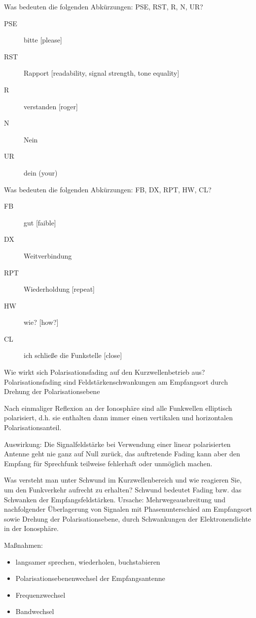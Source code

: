\documentclass[avery5371,grid,frame,a4paper]{flashcards}
\newcommand{\card}[3]{
  \begin{flashcard}[{\chap} -- #1]{#2}#3\end{flashcard}
}
\begin{document}
\card{42}{Was bedeuten die folgenden Abkürzungen: PSE, RST, R, N, UR?}{
  \begin{description}
    \item[PSE] bitte [please]
    \item[RST] Rapport [readability, signal strength, tone equality]
    \item[R] verstanden [roger]
    \item[N] Nein
    \item[UR] dein (your)
  \end{description}
}
\card{42}{Was bedeuten die folgenden Abkürzungen: FB, DX, RPT, HW, CL?}{
  \begin{description}
    \item[FB] gut [faible]
    \item[DX] Weitverbindung
    \item[RPT] Wiederholdung [repeat]
    \item[HW] wie? [how?]
    \item[CL] ich schließe die Funkstelle [close]
  \end{description}
}
\card{43}{Wie wirkt sich Polarisationsfading auf den Kurzwellenbetrieb aus?}{
  \small
  Polarisationsfading sind Feldstärkenschwankungen am Empfangsort durch Drehung der Polarisationsebene

  \item Nach einmaliger Reflexion an der Ionosphäre sind alle Funkwellen elliptisch polarisiert, d.h. sie enthalten dann immer einen vertikalen und horizontalen Polarisationsanteil.

  \item Auswirkung: Die Signalfeldstärke bei Verwendung einer linear polarisierten Antenne geht nie ganz auf Null zurück, das auftretende Fading kann aber den Empfang für Sprechfunk teilweise fehlerhaft oder unmöglich machen.
}
\card{44}{Was versteht man unter Schwund im Kurzwellenbereich und wie reagieren Sie, um den Funkverkehr aufrecht zu erhalten?}{
  \small
  Schwund bedeutet Fading bzw. das Schwanken der Empfangsfeldstärken. Ursache: Mehrwegeausbreitung und nachfolgender Überlagerung von Signalen mit Phasenunterschied am Empfangsort sowie Drehung der Polarisationsebene, durch Schwankungen der Elektronendichte in der Ionosphäre.

  Maßnahmen:
  \begin{itemize}\itemsep0pt
    \item langsamer sprechen, wiederholen, buchstabieren
    \item Polarisationsebenenwechsel der Empfangsantenne
    \item Frequenzwechsel
    \item Bandwechsel
  \end{itemize}
}
\end{document}
